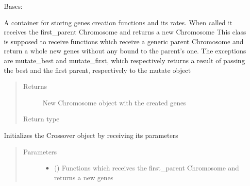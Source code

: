 \documentclass[letterpaper,10pt,english]{sphinxmanual}
\begin{document}
\begin{fulllineitems}
\label{\detokenize{genetic:genetic.Create}}
\sphinxAtStartPar
Bases: 

\sphinxAtStartPar
A container for storing genes creation functions and its rates. When called it receives the first\_parent
Chromosome and returns a new Chromosome
This class is supposed to receive functions which receive a generic parent Chromosome and return a whole new genes
without any bound to the parent’s one. The exceptions are mutate\_best and mutate\_first, which respectively returns
a result of passing the best and the first parent, respectively to the mutate object
\begin{quote}\begin{description}
\item[{Returns}] \leavevmode
\sphinxAtStartPar
New Chromosome object with the created genes

\item[{Return type}] \leavevmode
\sphinxAtStartPar
{\hyperref[\detokenize{genetic:genetic.Chromosome}]{}}

\end{description}\end{quote}

\sphinxAtStartPar
Initializes the Crossover object by receiving its parameters
\begin{quote}\begin{description}
\item[{Parameters}] \leavevmode\begin{itemize}
\item {} 
\sphinxAtStartPar
{} (\sphinxstyleliteralemphasis{\sphinxupquote{{[}}}\sphinxstyleliteralemphasis{\sphinxupquote{{[}}}\sphinxstyleliteralemphasis{\sphinxupquote{{[}}}{\hyperref[\detokenize{genetic:genetic.Chromosome}]{\sphinxcrossref{\sphinxstyleliteralemphasis{\sphinxupquote{Chromosome}}}}}\sphinxstyleliteralemphasis{\sphinxupquote{{]}}}\sphinxstyleliteralemphasis{\sphinxupquote{, }}\sphinxstyleliteralemphasis{\sphinxupquote{{]}}}\sphinxstyleliteralemphasis{\sphinxupquote{{]}}}) \textendash{} Functions which receives the first\_parent Chromosome and returns a new genes


\end{itemize}
\end{description}
\end{quote}
\end{fulllineitems}
\end{document}

